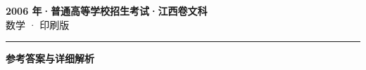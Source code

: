 \documentclass[zihao=5, a4paper]{ctexart}
\begin{document}
\begin{center}
  {\Large\bfseries 2006 年·普通高等学校招生考试·江西卷文科}\\[4pt]
  {\large 数学 · 印刷版}
\end{center}
\medskip
{}

\par\bigskip\hrule\bigskip
{}
\begin{center}{\large\bfseries 参考答案与详细解析}\end{center}
\smallskip

\end{document}
